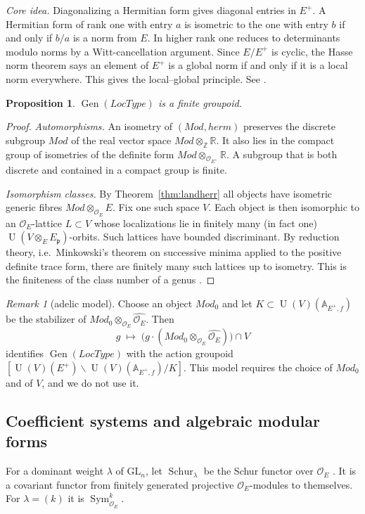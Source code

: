 \documentclass[11pt]{amsart}
\newtheorem{proposition}[theorem]{Proposition}
\theoremstyle{definition}
\theoremstyle{remark}
\newtheorem{remark}[theorem]{Remark}
\newcommand{\OEring}{\mathcal{O}_E}
\newcommand{\OEp}{\mathcal{O}_{E^+}}
\newcommand{\Md}{\mathit{Mod}}
\newcommand{\herm}{\mathit{herm}}
\newcommand{\LocType}{\mathit{LocType}}
\DeclareMathOperator{\Gen}{Gen}
\DeclareMathOperator{\Schur}{Schur}
\DeclareMathOperator{\Sym}{Sym}
\DeclareMathOperator{\U}{U}
\newcommand{\A}{\mathbb{A}}
\newcommand{\Z}{\mathbb{Z}}
\newcommand{\R}{\mathbb{R}}
\newcommand{\pp}{\mathfrak{p}}
\begin{document}
\noindent\emph{Core idea.} Diagonalizing a Hermitian form gives diagonal entries in $E^+$. A Hermitian form of rank one with entry $a$ is isometric to the one with entry $b$ if and only if $b/a$ is a norm from $E$. In higher rank one reduces to determinants modulo norms by a Witt-cancellation argument. Since $E/E^+$ is cyclic, the Hasse norm theorem says an element of $E^{+}$ is a global norm if and only if it is a local norm everywhere. This gives the local--global principle. See \cite[Ch.~10]{Scharlau}.

\begin{proposition}\label{prop:genus-finite}
$\Gen(\LocType)$ is a finite groupoid.
\end{proposition}

\begin{proof}
\emph{Automorphisms.} An isometry of $(\Md,\herm)$ preserves the discrete subgroup $\Md$ of the real vector space $\Md\otimes_{\Z}\R$. It also lies in the compact group of isometries of the definite form $\Md\otimes_{\OEp}\R$. A subgroup that is both discrete and contained in a compact group is finite.

\emph{Isomorphism classes.} By Theorem~\ref{thm:landherr} all objects have isometric generic fibres $\Md\otimes_{\OEring}E$. Fix one such space $V$. Each object is then isomorphic to an $\OEring$-lattice $L\subset V$ whose localizations lie in finitely many (in fact one) $\U(V\otimes_E E_\pp)$-orbits. Such lattices have bounded discriminant. By reduction theory, i.e.\ Minkowski's theorem on successive minima applied to the positive definite trace form, there are finitely many such lattices up to isometry. This is the finiteness of the class number of a genus \cite[\S5]{Borel-HC}.
\end{proof}

\begin{remark}[adelic model]
Choose an object $\Md_0$ and let $K\subset\U(V)(\A_{E^+,f})$ be the stabilizer of $\Md_0\otimes_{\OEring}\widehat{\OEring}$. Then
\[
g\;\longmapsto\;\bigl(g\cdot(\Md_0\otimes_{\OEring}\widehat{\OEring})\bigr)\cap V
\]
identifies $\Gen(\LocType)$ with the action groupoid $[\U(V)(E^+)\backslash\U(V)(\A_{E^+,f})/K]$. This model requires the choice of $\Md_0$ and of $V$, and we do not use it.
\end{remark}

\subsection{Coefficient systems and algebraic modular forms}
For a dominant weight $\lambda$ of $\mathrm{GL}_n$, let $\Schur_\lambda$ be the Schur functor over $\OEring$ \cite{ABW}. It is a covariant functor from finitely generated projective $\OEring$-modules to themselves. For $\lambda=(k)$ it is $\Sym^k_{\OEring}$.
\end{document}
